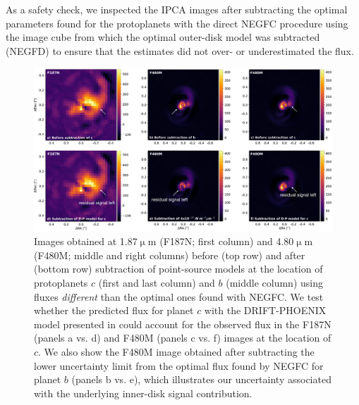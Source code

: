 \documentclass[longauth]{aa}
\newcommand{\vc}[1]{#1}
\begin{document}
\begin{appendix}
As a safety check, we inspected the IPCA images after subtracting the optimal parameters found for the protoplanets with the direct NEGFC procedure using the image cube from which the optimal outer-disk model was subtracted (NEGFD) to ensure that the estimates did not over- or underestimated the flux. 

    \begin{figure}[!t]
    \centering
    \includegraphics[width=\textwidth]{FigC2.pdf}
    \caption{Images obtained at 1.87$\upmu$m (F187N; first column) and 4.80$\upmu$m (F480M; middle and right columns) before (top row) and after (bottom row) subtraction of point-source models at the location of protoplanets $c$ (first and last column) and $b$ (middle column) using fluxes \textit{different} than the optimal ones found with NEGFC. We test whether the predicted flux for planet $c$ with the DRIFT-PHOENIX model presented in \citet{Wang2021} could account for the observed flux in the F187N (panels a vs. d) and F480M (panels c vs. f) images at the location of $c$. We also show the F480M image obtained after subtracting the lower uncertainty limit from the optimal flux found by NEGFC for planet $b$ (panels b vs. e), which illustrates our uncertainty associated with the underlying inner-disk signal contribution.
    }
    \label{fig:NEGFC_safety_checks}
    \end{figure}


\end{appendix}
\end{document}
